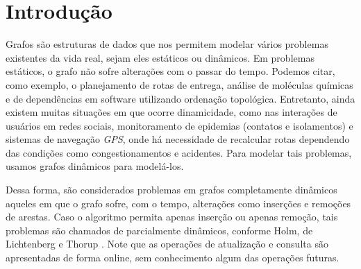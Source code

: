 

\chapter{Introdução}
\label{cap:introducao}

\enlargethispage{.5\baselineskip}

Grafos são estruturas de dados que nos permitem modelar vários problemas existentes da vida real, sejam eles estáticos ou dinâmicos. Em problemas estáticos, o grafo não sofre alterações com o passar do tempo. Podemos citar, como exemplo, o planejamento de rotas de entrega, análise de moléculas químicas e de dependências em software utilizando ordenação topológica. Entretanto, ainda existem muitas situações em que ocorre dinamicidade, como nas interações de usuários em redes sociais, monitoramento de epidemias (contatos e isolamentos) e sistemas de navegação \textit{GPS}, onde há necessidade de recalcular rotas dependendo das condições como congestionamentos e acidentes. Para modelar tais problemas, usamos grafos dinâmicos para modelá-los.

Dessa forma, são considerados problemas em grafos completamente dinâmicos aqueles em que o grafo sofre, com o tempo, alterações como inserções e remoções 
de arestas. Caso o algoritmo permita apenas inserção ou apenas remoção, tais 
problemas são chamados de parcialmente dinâmicos, conforme Holm, de Lichtenberg e Thorup \cite{jacob_holm}. Note que as operações de 
atualização e consulta são apresentadas de forma online, sem conhecimento algum das operações futuras.

